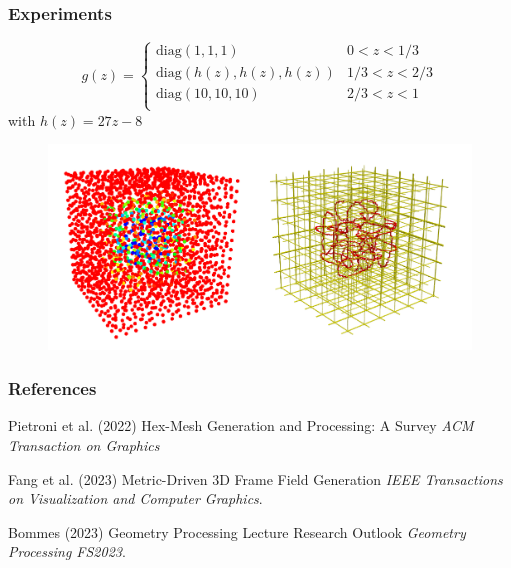 \documentclass[
	11pt, %
	aspectratio=169, %
]{beamer}
\begin{document}
\begin{frame}
	\frametitle{Experiments}
	\begin{equation}
		g(z) = \begin{cases}
			\mathrm{diag}(1,1,1) &0 < z < 1/3 \\
			\mathrm{diag}(h(z), h(z), h(z)) &1/3 < z < 2/3 \\
			\mathrm{diag}(10,10,10) &2/3 < z < 1 \\
	\end{cases}\end{equation}
	with $h(z)=27z-8$
	\begin{figure}
		\includegraphics[width=0.6\linewidth]{nonuniform.pdf}
	\end{figure}
\end{frame}


\begin{frame} %
	\frametitle{References}
	
	\begin{thebibliography}{99} %
		\footnotesize %
		
			Pietroni et al. (2022)
			\newblock Hex-Mesh Generation and Processing: A Survey
			\newblock \emph{ACM Transaction on Graphics}
			
			Fang et al. (2023)
			\newblock Metric-Driven 3D Frame Field Generation
			\newblock \emph{IEEE Transactions on Visualization and Computer Graphics}.

			Bommes (2023)
			\newblock Geometry Processing Lecture Research Outlook
			\newblock \emph{Geometry Processing FS2023}.
	\end{thebibliography}
\end{frame}
\end{document}
